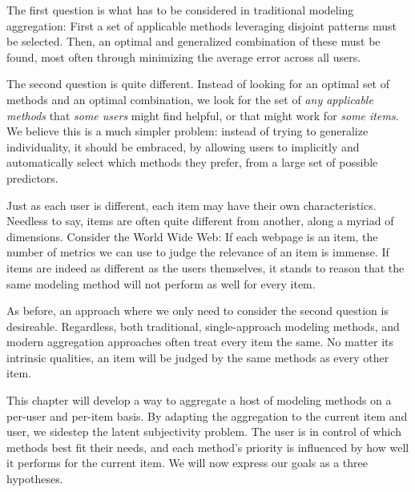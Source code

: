 The first question is what has to be considered in traditional modeling aggregation:
First a set of applicable methods leveraging disjoint patterns must be selected. 
Then, an optimal and generalized combination of these must be found,
most often through minimizing the average error across all users.

The second question is quite different. 
Instead of looking for an optimal set of methods and an optimal combination,
we look for the set of \emph{any applicable methods} that \emph{some users} might find helpful,
or that might work for \emph{some items}.
We believe this is a much simpler problem: 
instead of trying to generalize individuality,
it should be embraced, by allowing users to implicitly and automatically select which methods they prefer,
from a large set of possible predictors.

Just as each user is different, each item may have their own characteristics.
Needless to say, items are often quite different from another,
along a myriad of dimensions. Consider the World Wide Web:
If each webpage is an item, the number of metrics we can use to judge
the relevance of an item is immense.
If items are indeed as different as the users themselves, it stands to reason that the same 
modeling method will not perform as well for every item.

As before, an approach where we only need to consider the second question is desireable.
Regardless, both traditional, single-approach modeling methods, and modern aggregation approaches
often treat every item the same. No matter its intrinsic qualities, an item will be judged
by the same methods as every other item. 

This chapter will develop a way to aggregate a host of modeling methods on a per-user and per-item basis.
By adapting the aggregation to the current item and user, we sidestep the latent subjectivity problem. 
The user is in control of which methods best fit their needs, and
each method's priority is influenced by how well it performs for the current item.
We will now express our goals as a three hypotheses.

